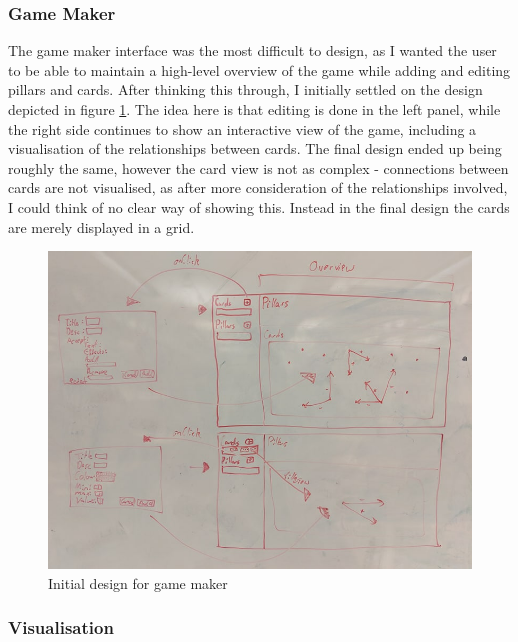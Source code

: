 \subsubsection{Game Maker}
The game maker interface was the most difficult to design, as I wanted the user to be able to maintain a high-level overview of the game while adding and editing pillars and cards. 
After thinking this through, I initially settled on the design depicted in figure \ref{fig:game_maker_drawing}. The idea here is that editing is done in the left panel, while the right side continues to show an interactive view of the game, including a visualisation of the relationships between cards.
The final design ended up being roughly the same, however the card view is not as complex - connections between cards are not visualised, as after more consideration of the relationships involved, I could think of no clear way of showing this.
Instead in the final design the cards are merely displayed in a grid.

\begin{figure}[!h]
	\centering
	\includegraphics[width=1.0\textwidth]{./images/design/game_maker_drawing.png}
	\caption{Initial design for game maker}
	\label{fig:game_maker_drawing}
\end{figure}

\subsubsection{Visualisation}

